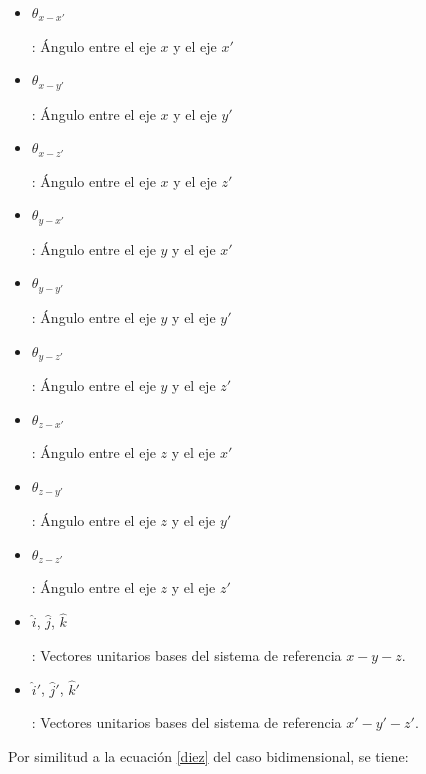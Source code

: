 \documentclass[12pt,letterpaper]{article}
\begin{document}
%
\begin{itemize}
	\item \begin{large}$\theta_{x-x'}$\end{large}: Ángulo entre el eje $x$ y el eje $x'$
	\item \begin{large}$\theta_{x-y'}$\end{large}: Ángulo entre el eje $x$ y el eje $y'$
	\item \begin{large}$\theta_{x-z'}$\end{large}: Ángulo entre el eje $x$ y el eje $z'$
	\item \begin{large}$\theta_{y-x'}$\end{large}: Ángulo entre el eje $y$ y el eje $x'$
	\item \begin{large}$\theta_{y-y'}$\end{large}: Ángulo entre el eje $y$ y el eje $y'$
	\item \begin{large}$\theta_{y-z'}$\end{large}: Ángulo entre el eje $y$ y el eje $z'$
	\item \begin{large}$\theta_{z-x'}$\end{large}: Ángulo entre el eje $z$ y el eje $x'$
	\item \begin{large}$\theta_{z-y'}$\end{large}: Ángulo entre el eje $z$ y el eje $y'$
	\item \begin{large}$\theta_{z-z'}$\end{large}: Ángulo entre el eje $z$ y el eje $z'$
	\item \begin{large}$\hat{i}$, $\hat{j}$, $\hat{k}$\end{large}: Vectores unitarios bases del sistema de referencia $x-y-z$.
	\item \begin{large}$\hat{i}'$, $\hat{j}'$, $\hat{k}'$\end{large}: Vectores unitarios bases del sistema de referencia $x'-y'-z'$.
\end{itemize}
%
Por similitud a la ecuación \ref{diez} del caso bidimensional, se tiene: 
%
\end{document}
